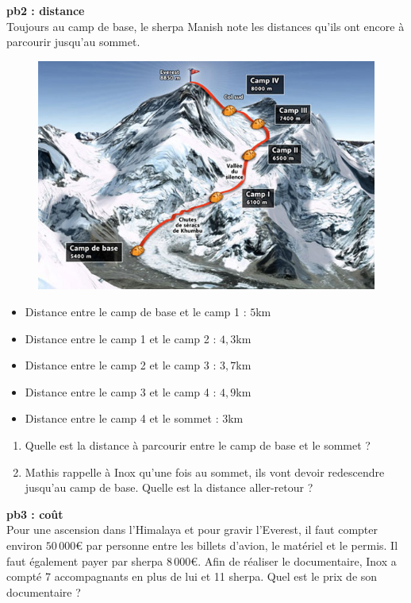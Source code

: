 \textbf{pb2 : distance} \\
 
Toujours au camp de base, le sherpa Manish note les distances qu'ils ont encore à parcourir jusqu'au sommet. 

\begin{multicols}{2}

\begin{figure}[H]
  \centering
  \includegraphics[width=0.8\linewidth]{5x1-calcul-numerique/camp.jpg}
\end{figure} \columnbreak

\begin{itemize}[label={$\bullet$}]
  \item Distance entre le camp de base et le camp 1 : $5$km \\
  \item Distance entre le camp 1 et le camp 2 : $4,3$km \\
  \item Distance entre le camp 2 et le camp 3 : $3,7$km \\
  \item Distance entre le camp 3 et le camp 4 : $4,9$km \\
  \item Distance entre le camp 4 et le sommet : $3$km \\
\end{itemize} 

\end{multicols}

\begin{enumerate}
  \item[1.] Quelle est la distance à parcourir entre le camp de base et le sommet ?
  \item[2.] Mathis rappelle à Inox qu'une fois au sommet, ils vont devoir redescendre jusqu'au camp de base. Quelle est la distance aller-retour ? \\
\end{enumerate}

\textbf{pb3 : coût} \\

Pour une ascension dans l’Himalaya et pour gravir l’Everest, il faut compter environ $50\,000$€ par personne entre les billets d'avion, le matériel et le permis. Il faut également payer par sherpa $8\,000$€. Afin de réaliser le documentaire, Inox a compté 7 accompagnants en plus de lui et 11 sherpa. Quel est le prix de son documentaire ?


